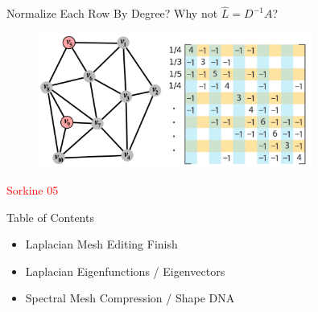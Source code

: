 \documentclass{beamer}
\begin{document}
\begin{frame}{Normalize Each Row By Degree?}
Why not $\hat{L} = D^{-1}A$?

\begin{figure}[t]
    \includegraphics[width=0.8\textwidth]{Sorkine05_GraphLaplacian.png}
\end{figure}
\small \textcolor{red}{Sorkine 05}


\end{frame}


\begin{frame}{Table of Contents}

\begin{itemize}[label=$\vartriangleright$]
	\item Laplacian Mesh Editing Finish
\end{itemize}

\begin{itemize}[label=$\vartriangleright$]
	\item Laplacian Eigenfunctions / Eigenvectors
\end{itemize}

\begin{itemize}[label=$\blacktriangleright$]
	\item Spectral Mesh Compression / Shape DNA
\end{itemize}

\end{frame}
\end{document}
